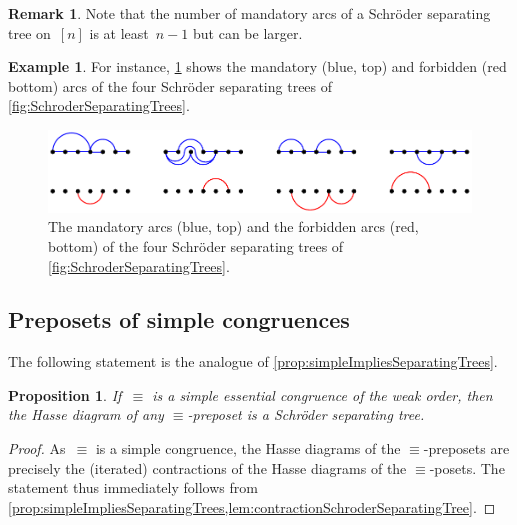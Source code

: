 \documentclass{amsart}
\newtheorem{proposition}[theorem]{Proposition}
\theoremstyle{definition}
\newtheorem{example}[theorem]{Example}
\newtheorem{remark}[theorem]{Remark}
\begin{document}
\begin{remark}
Note that the number of mandatory arcs of a Schröder separating tree on~$[n]$ is at least~$n-1$ but can be larger.
\end{remark}

\begin{example}
For instance, \cref{fig:mandatoryForbiddenArcsSchroderSeparatingTrees} shows the mandatory (blue, top) and forbidden (red bottom) arcs of the four Schröder separating trees of \cref{fig:SchroderSeparatingTrees}.
%
\begin{figure}
	\capstart
	\centerline{\includegraphics[scale=.85]{mandatoryForbiddenArcsSchroderSeparatingTrees}}
	\caption{The mandatory arcs (blue, top) and the forbidden arcs (red, bottom) of the four Schröder separating trees of \cref{fig:SchroderSeparatingTrees}.}
	\label{fig:mandatoryForbiddenArcsSchroderSeparatingTrees}
\end{figure}
%
\end{example}


\subsection{Preposets of simple congruences}
\label{subsec:preposetsSimpleCongruences}

The following statement is the analogue of \cref{prop:simpleImpliesSeparatingTrees}.

\begin{proposition}
\label{prop:simpleImpliesSchroderSeparatingTrees}
If~$\equiv$ is a simple essential congruence of the weak order, then the Hasse diagram of any $\equiv$-preposet is a Schröder separating tree.
\end{proposition}

\begin{proof}
As~$\equiv$ is a simple congruence, the Hasse diagrams of the $\equiv$-preposets are precisely the (iterated) contractions of the Hasse diagrams of the $\equiv$-posets.
The statement thus immediately follows from \cref{prop:simpleImpliesSeparatingTrees,lem:contractionSchroderSeparatingTree}.
\end{proof}
\end{document}
